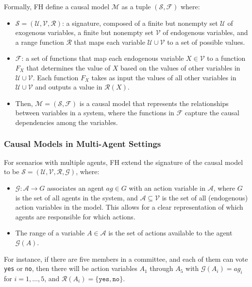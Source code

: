 \documentclass{article}
\begin{document}
Formally, FH define a causal model $\mathcal{M}$ as a tuple $(\mathcal{S},\mathcal{F})$ where:

\begin{itemize}
  \item $\mathcal{S} = (\mathcal{U},\mathcal{V},\mathcal{R})$: a signature, composed of a finite but nonempty set $\mathcal{U}$ of exogenous variables, a finite but nonempty set $\mathcal{V}$ of endogenous variables, and a range function $\mathcal{R}$ that maps each variable $\mathcal{U} \cup \mathcal{V}$ to a set of possible values.
  \item $\mathcal{F}$: a set of functions that map each endogenous variable $X \in \mathcal{V}$ to a function $F_X$ that determines the value of $X$ based on the values of other variables in $\mathcal{U} \cup \mathcal{V}$. Each function $F_X$ takes as input the values of all other variables in $\mathcal{U} \cup \mathcal{V}$ and outputs a value in $\mathcal{R}(X)$.
  \item Then, $\mathcal{M}=(\mathcal{S},\mathcal{F})$ is a causal model that represents the relationships between variables in a system, where the functions in $\mathcal{F}$ capture the causal dependencies among the variables.
\end{itemize}

\subsubsection{Causal Models in Multi-Agent Settings}

For scenarios with multiple agents, FH extend the signature of the causal model to be $\mathcal{S} = (\mathcal{U},\mathcal{V},\mathcal{R},\mathcal{G})$, where:

\begin{itemize}
  \item $\mathcal{G}: \mathcal{A} \rightarrow G$ associates an agent $ag \in G$ with an action variable in $\mathcal{A}$, where $G$ is the set of all agents in the system, and $\mathcal{A} \subseteq \mathcal{V}$ is the set of all (endogenous) action variables in the model. This allows for a clear representation of which agents are responsible for which actions.
  \item The range of a variable $A \in \mathcal{A}$ is the set of actions available to the agent $\mathcal{G}(A)$.
\end{itemize}

For instance, if there are five members in a committee, and each of them can vote \texttt{yes} or \texttt{no}, then there will be action variables $A_1$ through $A_5$ with $\mathcal{G}(A_i) = ag_i$ for $i=1,\ldots,5$, and $\mathcal{R}(A_i) = \{\texttt{yes},\texttt{no}\}$.
\end{document}
